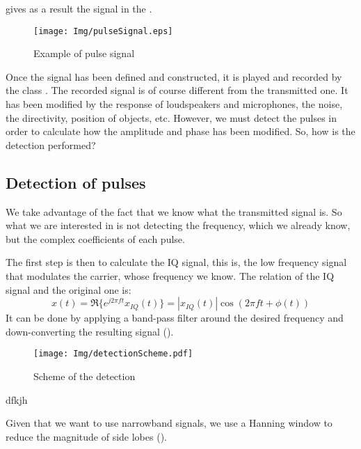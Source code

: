 gives as a result the signal in the .

\begin{figure}[h]
	\centering
	\texttt{[image: Img/pulseSignal.eps]}
	\caption[Pulse Signal]{Example of pulse signal}
	\label{examplePulseSignal}
\end{figure}


Once the signal has been defined and constructed, it is played and recorded by the class . The recorded signal is of course different from the transmitted one. It has been modified by the response of loudspeakers and microphones, the noise, the directivity, position of objects, etc. However, we must detect the pulses in order to calculate how the amplitude and phase has been modified. So, how is the detection performed?

\subsection{Detection of pulses}
We take advantage of the fact that we know what the transmitted signal is. So what we are interested in is not detecting the frequency, which we already know, but the complex coefficients of each pulse.

The first step is then to calculate the IQ signal, this is, the low frequency signal that modulates the carrier, whose frequency we know. The relation of the IQ signal and the original one is:
\begin{equation}
x(t) = \Re\{ e^{j 2 \pi f t} x_{IQ}(t) \} = |x_{IQ}(t)| \cos(2 \pi f t + \phi(t))
\label{IQcondition}
\end{equation}
It can be done by applying a band-pass filter around the desired frequency and down-converting the resulting signal ().
\begin{figure}[h]
	\centering
	\texttt{[image: Img/detectionScheme.pdf]}
	\caption[Detection Scheme]{Scheme of the detection}
	\label{detectionScheme}
\end{figure}

dfkjh

Given that we want to use narrowband signals, we use a Hanning window to reduce the magnitude of side lobes ().

